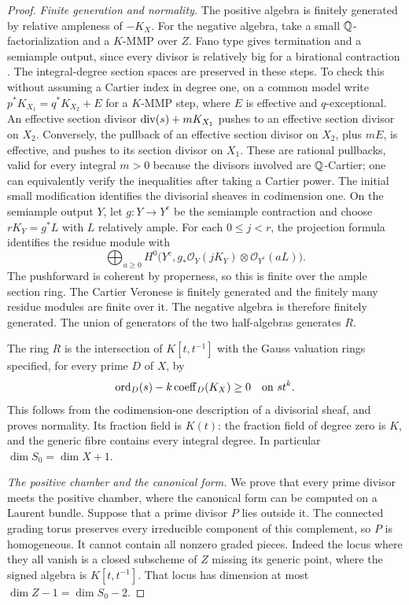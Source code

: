 \begin{proof}
\textit{Finite generation and normality.}
The positive algebra is finitely generated by relative ampleness of
$-K_X$.  For the negative algebra, take a small $\mathbb Q$-factorialization
and a $K$-MMP over $Z$.  Fano type gives termination and a semiample
output, since every divisor is relatively big for a birational
contraction \cite{BCHM}.  The integral-degree section spaces are
preserved in these steps.  To check this without assuming a Cartier
index in degree one, on a common model write
$p^*K_{X_1}=q^*K_{X_2}+E$ for a $K$-MMP step, where $E$ is effective
and $q$-exceptional.  An effective section divisor
$\operatorname{div}(s)+mK_{X_1}$ pushes to an effective section divisor on $X_2$.
Conversely, the pullback of an effective section divisor on $X_2$,
plus $mE$, is effective, and pushes to its section divisor on $X_1$.
These are rational pullbacks, valid for every integral $m>0$ because
the divisors involved are $\mathbb Q$-Cartier; one can equivalently verify
the inequalities after taking a Cartier power.  The initial small
modification identifies the divisorial sheaves in codimension one.
On the semiample output $Y$, let $g:Y\to Y^{\mathrm c}$ be the
semiample contraction and choose $rK_Y=g^*L$ with $L$ relatively ample.
For each $0\le j<r$, the projection formula identifies the residue
module with
\[
 \bigoplus_{a\ge0}
 H^0\bigl(Y^{\mathrm c},g_*\mathcal O_Y(jK_Y)\otimes
                           \mathcal O_{Y^{\mathrm c}}(aL)\bigr).
\]
The pushforward is coherent by properness, so this is finite over the
ample section ring.  The Cartier Veronese is finitely generated and
the finitely many residue modules are finite over it.  The negative
algebra is therefore finitely generated.  The union of generators of
the two half-algebras generates $R$.

The ring $R$ is the intersection of $K[t,t^{-1}]$ with the Gauss
valuation rings specified, for every prime $D$ of $X$, by
\[
 \operatorname{ord}_D(s)-k\operatorname{coeff}_D(K_X)\ge0
 \quad\text{on }s t^k.
\]
This follows from the codimension-one description of a divisorial
sheaf, and proves normality.  Its fraction field is $K(t)$: the
fraction field of degree zero is $K$, and the generic fibre contains
every integral degree.  In particular $\dim S_0=\dim X+1$.

\medskip
\noindent\textit{The positive chamber and the canonical form.}
We prove that every prime divisor meets the positive chamber, where
the canonical form can be computed on a Laurent bundle.  Suppose
that a prime divisor $P$ lies outside it.  The connected grading torus
preserves every irreducible component of this complement, so $P$ is
homogeneous.  It cannot contain all nonzero graded pieces.  Indeed the
locus where they all vanish is a closed subscheme of $Z$ missing its
generic point, where the signed algebra is $K[t,t^{-1}]$.  That locus
has dimension at most $\dim Z-1=\dim S_0-2$.


\end{proof}
